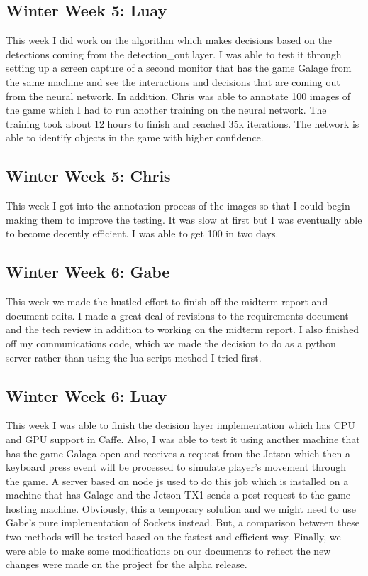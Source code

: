 \documentclass[onecolumn, draftclsnofoot,10pt, compsoc]{IEEEtran}
\begin{document}
\subsection{Winter Week 5: Luay}
This week I did work on the algorithm which makes decisions based on the detections coming from the detection_out layer. I was able to test it through setting up a screen capture of a second monitor that has the game Galage from the same machine and see the interactions and decisions that are coming out from the neural network. In addition, Chris was able to annotate 100 images of the game which I had to run another training on the neural network. The training took about 12 hours to finish and reached 35k iterations. The network is able to identify objects in the game with higher confidence.
\subsection{Winter Week 5: Chris}
This week I got into the annotation process of the images so that I could begin making them to improve the testing. It was slow at first but I was eventually able to become decently efficient. I was able to get 100 in two days.
\subsection{Winter Week 6: Gabe}
This week we made the hustled effort to finish off the midterm report and document edits. I made a great deal of revisions to the requirements document and the tech review in addition to working on the midterm report. I also finished off my communications code, which we made the decision to do as a python server rather than using the lua script method I tried first.
\subsection{Winter Week 6: Luay}
This week I was able to finish the decision layer implementation which has CPU and GPU support in Caffe. Also, I was able to test it using another machine that has the game Galaga open and receives a request from the Jetson which then a keyboard press event will be processed to simulate player's movement through the game. A server based on node js used to do this job which is installed on a machine that has Galage and the Jetson TX1 sends a post request to the game hosting machine. Obviously, this a temporary solution and we might need to use Gabe's pure implementation of Sockets instead. But, a comparison between these two methods will be tested based on the fastest and efficient way. Finally, we were able to make some modifications on our documents to reflect the new changes were made on the project for the alpha release.
\end{document}
